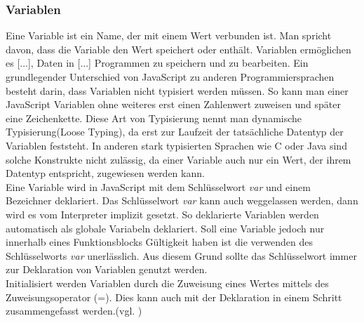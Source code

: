 \subsubsection{Variablen} \glqq Eine Variable ist ein Name, der mit einem Wert verbunden ist. Man spricht davon, dass die Variable den Wert speichert oder enthält. Variablen ermöglichen es [...], Daten in [...] Programmen zu speichern und zu bearbeiten.\grqq{}\cite[S.51]{FlanJava2007} Ein grundlegender Unterschied von JavaScript zu anderen Programmiersprachen besteht darin, dass Variablen nicht typisiert werden müssen. So kann man einer JavaScript Variablen ohne weiteres erst einen Zahlenwert zuweisen und später eine Zeichenkette. Diese Art von Typisierung nennt man dynamische Typisierung(Loose Typing), da erst zur Laufzeit der tatsächliche Datentyp der Variablen feststeht. In anderen stark typisierten Sprachen wie C oder Java sind solche Konstrukte nicht zulässig, da einer Variable auch nur ein Wert, der ihrem Datentyp entspricht, zugewiesen werden kann.\\Eine Variable wird in JavaScript mit dem Schlüsselwort \textit{var} und einem Bezeichner deklariert. Das Schlüsselwort \textit{var} kann auch weggelassen werden, dann wird es vom Interpreter implizit gesetzt. So deklarierte Variablen werden automatisch als globale Variabeln deklariert. Soll eine Variable jedoch nur innerhalb eines Funktionsblocks Gültigkeit haben ist die verwenden des Schlüsselworts \textit{var} unerlässlich. Aus diesem Grund sollte das Schlüsselwort immer zur Deklaration von Variablen genutzt werden.\\Initialisiert werden Variablen durch die Zuweisung eines Wertes mittels des Zuweisungsoperator (=). Dies kann auch mit der Deklaration in einem Schritt zusammengefasst werden.(vgl. \cite[S.52ff]{FlanJava2007})

